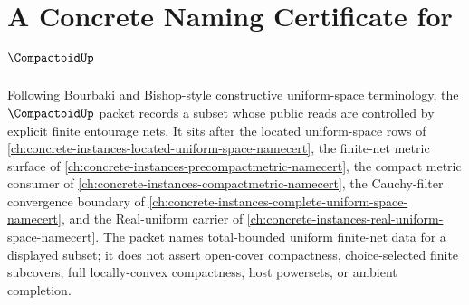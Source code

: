 \chapter{A Concrete Naming Certificate for $\CompactoidUp$}
\label{ch:concrete-instances-compactoid-namecert}

Following Bourbaki and Bishop-style constructive uniform-space terminology, the $\CompactoidUp$ packet records a subset whose public reads are controlled by explicit finite entourage nets. It sits after the located uniform-space rows of \autoref{ch:concrete-instances-located-uniform-space-namecert}, the finite-net metric surface of \autoref{ch:concrete-instances-precompactmetric-namecert}, the compact metric consumer of \autoref{ch:concrete-instances-compactmetric-namecert}, the Cauchy-filter convergence boundary of \autoref{ch:concrete-instances-complete-uniform-space-namecert}, and the Real-uniform carrier of \autoref{ch:concrete-instances-real-uniform-space-namecert}. The packet names total-bounded uniform finite-net data for a displayed subset; it does not assert open-cover compactness, choice-selected finite subcovers, full locally-convex compactness, host powersets, or ambient completion.

